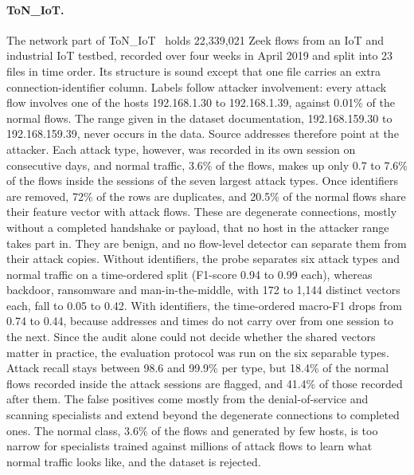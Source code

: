 \paragraph{ToN\_IoT.}
The network part of ToN\_IoT~\cite{moustafa2021toniot,booij2022toniot} holds 22{,}339{,}021
Zeek flows from an IoT and industrial IoT testbed, recorded over four weeks in April 2019
and split into 23 files in time order. Its structure is sound except that one file
carries an extra connection-identifier column. Labels follow attacker involvement: every
attack flow involves one of the hosts 192.168.1.30 to 192.168.1.39, against 0.01\% of the
normal flows. The range given in the dataset documentation, 192.168.159.30 to
192.168.159.39, never occurs in the data. Source addresses therefore point at the
attacker. Each attack type, however, was recorded in its own session on consecutive days,
and normal traffic, 3.6\% of the flows, makes up only 0.7 to 7.6\% of the flows inside
the sessions of the seven largest attack types. Once identifiers are removed, 72\% of the rows are duplicates, and 20.5\%
of the normal flows share their feature vector with attack flows. These are degenerate
connections, mostly without a completed handshake or payload, that no host in the attacker
range takes part in. They are benign, and no flow-level detector can separate them from
their attack copies. Without identifiers, the probe separates six attack types and normal
traffic on a time-ordered split (F1-score 0.94 to 0.99 each), whereas backdoor,
ransomware and man-in-the-middle, with 172 to 1{,}144 distinct vectors each, fall to 0.05
to 0.42. With identifiers, the time-ordered macro-F1 drops from 0.74 to 0.44, because
addresses and times do not carry over from one session to the next. Since the audit alone
could not decide whether the shared vectors matter in practice, the evaluation protocol
was run on the six separable types. Attack recall stays between 98.6 and 99.9\% per type,
but 18.4\% of the normal flows recorded inside the attack sessions are flagged, and
41.4\% of those recorded after them. The false positives come mostly from the
denial-of-service and scanning specialists and extend beyond the degenerate connections to
completed ones. The normal class, 3.6\% of the flows and generated by few hosts, is too
narrow for specialists trained against millions of attack flows to learn what normal
traffic looks like, and the dataset is rejected.

